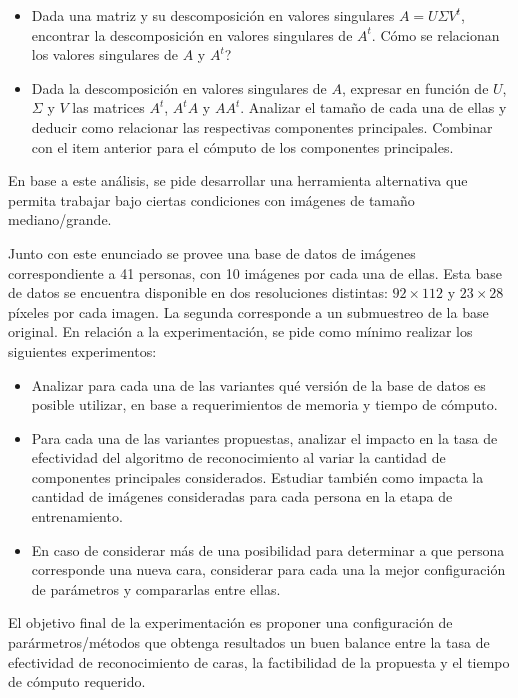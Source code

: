 \begin{itemize}
\item Dada una matriz y su descomposici\'on en valores singulares $A = U \Sigma V^t$, encontrar la descomposici\'on en
valores singulares de $A^t$. C\'omo se relacionan los valores singulares de $A$ y $A^t$?
\item Dada la descomposici\'on en valores singulares de $A$, expresar en funci\'on de $U$, $\Sigma$ y $V$ las matrices
$A^t$, $A^tA$ y $AA^t$. Analizar el tama\~no de cada una de ellas y deducir como relacionar las respectivas componentes
principales.
Combinar con el item anterior para el c\'omputo de los componentes principales.
\end{itemize}

En base a este an\'alisis, se pide desarrollar una herramienta alternativa que permita trabajar bajo ciertas condiciones
con im\'agenes de tama\~no mediano/grande.

Junto con este enunciado se provee una base de datos de im\'agenes correspondiente a 41 personas, con 10
im\'agenes por cada una de ellas. Esta base de datos se encuentra disponible en dos resoluciones distintas: $92 \times
112$ y $23 \times 28$ p\'ixeles por cada imagen. La segunda corresponde a un submuestreo de la base original.
En relaci\'on a la experimentaci\'on, se pide como m\'inimo realizar los siguientes experimentos:
\begin{itemize}
\item Analizar para cada una de las variantes qu\'e versi\'on de la base de datos es posible utilizar, en base a
requerimientos de memoria y tiempo de c\'omputo.

\item Para cada una de las variantes propuestas, analizar el impacto en la tasa de efectividad del algoritmo de reconocimiento al
variar la cantidad de componentes principales considerados. Estudiar tambi\'en como impacta la cantidad de im\'agenes
consideradas para cada persona en la etapa de entrenamiento.

\item En caso de considerar m\'as de una posibilidad para determinar a que persona corresponde una nueva cara,
considerar para cada una la mejor configuraci\'on de par\'ametros y compararlas entre ellas.
\end{itemize}

El objetivo final de la experimentaci\'on es proponer una configuraci\'on de par\'armetros/m\'etodos que obtenga
resultados un buen balance entre la tasa de efectividad de reconocimiento de caras, la factibilidad de la propuesta y el
tiempo de c\'omputo requerido.

